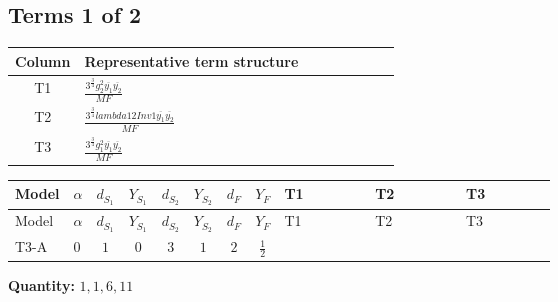 \documentclass[8pt]{article}
\begin{document}
\begin{landscape}
\subsection*{Terms 1 of 2}
\begin{center}
\begin{tabular}{@{}c >{\raggedright\arraybackslash}p{0.82\linewidth}@{}}
\toprule
Column & Representative term structure \\
\midrule
T1 & \(\displaystyle \frac{3^{\frac{3}{4}} g_{2}^{2} \overline{y_{1}} \overline{y_{2}}}{MF}\) \\
\midrule
T2 & \(\displaystyle \frac{3^{\frac{3}{4}} lambda12Inv1 \overline{y_{1}} \overline{y_{2}}}{MF}\) \\
\midrule
T3 & \(\displaystyle \frac{3^{\frac{3}{4}} g_{1}^{2} \overline{y_{1}} \overline{y_{2}}}{MF}\) \\
\midrule
\bottomrule
\end{tabular}
\end{center}
\smallskip
\tiny
\begin{longtable}{@{}llcccccc >{\raggedright\arraybackslash}p{0.21\linewidth} >{\raggedright\arraybackslash}p{0.21\linewidth} >{\raggedright\arraybackslash}p{0.21\linewidth}@{}}
\toprule
Model & $\alpha$ & $d_{S_1}$ & $Y_{S_1}$ & $d_{S_2}$ & $Y_{S_2}$ & $d_F$ & $Y_F$ & T1 & T2 & T3 \\
\midrule
\endfirsthead
\toprule
Model & $\alpha$ & $d_{S_1}$ & $Y_{S_1}$ & $d_{S_2}$ & $Y_{S_2}$ & $d_F$ & $Y_F$ & T1 & T2 & T3 \\
\midrule
\endhead
T3-A & $0$ & $1$ & $0$ & $3$ & $1$ & $2$ & $\frac{1}{2}$ & \scriptsize\adjustbox{max width=\linewidth}{$\begin{gathered} - \frac{17 \cdot 3^{\frac{3}{4}} g_{2}^{2} \overline{y_{1}} \overline{y_{2}}}{24 MF}\end{gathered}$} & \scriptsize\adjustbox{max width=\linewidth}{$\begin{gathered} - \frac{3^{\frac{3}{4}} lambda12Inv1 \overline{y_{1}} \overline{y_{2}}}{6 MF}\end{gathered}$} & \scriptsize\adjustbox{max width=\linewidth}{$\begin{gathered} - \frac{3^{\frac{3}{4}} g_{1}^{2} \overline{y_{1}} \overline{y_{2}}}{8 MF}\end{gathered}$} \\
\midrule
\bottomrule
\end{longtable}
\clearpage
\noindent\textbf{Quantity: }$\mathrm{1,1,6,11}$\par\smallskip

\end{landscape}
\end{document}
